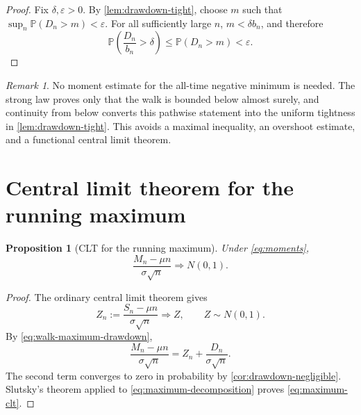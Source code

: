 \documentclass[10pt,reqno,a4paper]{amsart}
\numberwithin{equation}{section}
\theoremstyle{plain}
\newtheorem{proposition}[theorem]{Proposition}
\theoremstyle{definition}
\theoremstyle{remark}
\newtheorem{remark}[theorem]{Remark}
\newcommand{\Pp}{\mathbb{P}}
\newcommand{\1}{\mathbf{1}}
\newcommand{\ind}{\Rightarrow}
\begin{document}
\begin{proof}
  Fix $\delta,\varepsilon>0$.  By \cref{lem:drawdown-tight}, choose $m$ such
  that $\sup_n\Pp(D_n>m)<\varepsilon$.  For all sufficiently large $n$,
  $m<\delta b_n$, and therefore
  \begin{equation*}
    \Pp\left(\frac{D_n}{b_n}>\delta\right)
    \leq\Pp(D_n>m)
    <\varepsilon.
  \end{equation*}
\end{proof}

\begin{remark}\label{rem:why-reversal}
  No moment estimate for the all-time negative minimum is needed.  The strong
  law proves only that the walk is bounded below almost surely, and
  continuity from below converts this pathwise statement into the uniform
  tightness in \cref{lem:drawdown-tight}.  This avoids a maximal inequality,
  an overshoot estimate, and a functional central limit theorem.
\end{remark}

\section{Central limit theorem for the running maximum}
\label{sec:maximum-clt}

\begin{proposition}[CLT for the running maximum]
\label{prop:maximum-clt}
  Under \cref{eq:moments},
  \begin{equation}\label{eq:maximum-clt}
    \frac{M_n-\mu n}{\sigma\sqrt n}
    \ind N(0,1).
  \end{equation}
\end{proposition}

\begin{proof}
  The ordinary central limit theorem gives
  \begin{equation}\label{eq:sum-clt}
    Z_n:=\frac{S_n-\mu n}{\sigma\sqrt n}
    \ind Z,
    \qquad Z\sim N(0,1).
  \end{equation}
  By \cref{eq:walk-maximum-drawdown},
  \begin{equation}\label{eq:maximum-decomposition}
    \frac{M_n-\mu n}{\sigma\sqrt n}
    =
    Z_n+\frac{D_n}{\sigma\sqrt n}.
  \end{equation}
  The second term converges to zero in probability by
  \cref{cor:drawdown-negligible}.  Slutsky's theorem applied to
  \cref{eq:maximum-decomposition} proves \cref{eq:maximum-clt}.
\end{proof}
\end{document}

